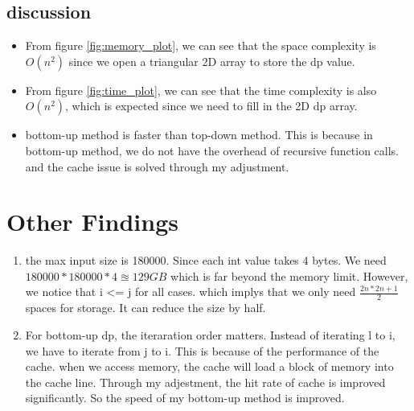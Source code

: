 \documentclass[a4paper,12pt]{article}
\begin{document}
\subsection{discussion}
\begin{itemize}
    \item From figure \ref{fig:memory_plot}, we can see that the space complexity is $O(n^2)$ since we open a triangular 2D array to store the dp value.
    \item From figure \ref{fig:time_plot}, we can see that the time complexity is also $O(n^2)$, which is expected since we need to fill in the 2D dp array.
    \item bottom-up method is faster than top-down method. This is because in bottom-up method, we do not have the overhead of recursive function calls. and the cache issue is solved through my adjustment.
\end{itemize}

\section{Other Findings}
\begin{enumerate}
    \item the max input size is 180000. Since each int value takes 4 bytes. We need $180000*180000*4 \approxeq 129GB$ 
    which is far beyond the memory limit. However, we notice that i <= j for all cases. which implys that we only need $\frac{2n*2n+1}{2}$ spaces for storage.
    It can reduce the size by half. 
    \item For bottom-up dp, the iteraration order matters. Instead of iterating l to i, we have to iterate from j to i. This is because of the performance of the cache.
    when we access memory, the cache will load a block of memory into the cache line. Through my adjestment, the hit rate of cache is improved significantly. So the speed of 
    my bottom-up method is improved.
\end{enumerate}
\end{document}
